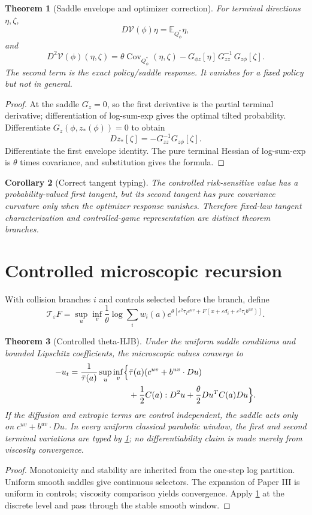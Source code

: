\documentclass[11pt,reqno]{amsart}
\newtheorem{theorem}{Theorem}[section]
\newtheorem{corollary}[theorem]{Corollary}
\theoremstyle{remark}
\newcommand{\E}{\mathbb E}
\newcommand{\Cov}{\operatorname{Cov}}
\begin{document}
\begin{theorem}[Saddle envelope and optimizer correction]\label{thm:envelope}
For terminal directions $\eta,\zeta$,
\[
 D\mathcal V(\phi)\eta
 =\E_{Q_\phi^*}\eta,
\]
and
\[
 D^2\mathcal V(\phi)(\eta,\zeta)
 =\theta\Cov_{Q_\phi^*}(\eta,\zeta)
 -G_{\phi z}[\eta]\,G_{zz}^{-1}\,G_{z\phi}[\zeta].
\]
The second term is the exact policy/saddle response.  It vanishes for a fixed
policy but not in general.
\end{theorem}
\begin{proof}
At the saddle $G_z=0$, so the first derivative is the partial terminal
derivative; differentiation of log-sum-exp gives the optimal tilted
probability.  Differentiate $G_z(\phi,z_*(\phi))=0$ to obtain
\[
 Dz_*[\zeta]=-G_{zz}^{-1}G_{z\phi}[\zeta].
\]
Differentiate the first envelope identity.  The pure terminal Hessian of
log-sum-exp is $\theta$ times covariance, and substitution gives the formula.
\end{proof}

\begin{corollary}[Correct tangent typing]\label{cor:typing}
The controlled risk-sensitive value has a probability-valued first tangent,
but its second tangent has pure covariance curvature only when the optimizer
response vanishes.  Therefore fixed-law tangent characterization and
controlled-game representation are distinct theorem branches.
\end{corollary}

\section{Controlled microscopic recursion}
With collision branches $i$ and controls selected before the branch, define
\[
 \mathcal T_\varepsilon F
 =\sup_u\inf_v\frac1\theta\log\sum_iw_i(a)
 e^{\theta[\varepsilon^2\tau_i c^{uv}
 +F(x+\varepsilon d_i+\varepsilon^2\tau_i b^{uv})]}.
\]

\begin{theorem}[Controlled theta-HJB]\label{thm:controlled-hjb}
Under the uniform saddle conditions and bounded Lipschitz coefficients, the
microscopic values converge to
\[
\begin{aligned}
 -u_t=\frac1{\bar\tau(a)}\sup_u\inf_v\Bigl\{
 &\bar\tau(a)(c^{uv}+b^{uv}\cdot Du)\\
 &+\frac12C(a):D^2u
 +\frac\theta2Du^TC(a)Du\Bigr\}.
\end{aligned}
\]
If the diffusion and entropic terms are control independent, the saddle acts
only on $c^{uv}+b^{uv}\cdot Du$.  In every uniform classical parabolic window, the first and second terminal
variations are typed by \cref{thm:envelope}; no differentiability claim is
made merely from viscosity convergence.
\end{theorem}
\begin{proof}
Monotonicity and stability are inherited from the one-step log partition.
Uniform smooth saddles give continuous selectors.  The expansion of Paper III
is uniform in controls; viscosity comparison yields convergence.  Apply
\cref{thm:envelope} at the discrete level and pass through the stable smooth
window.
\end{proof}
\end{document}
